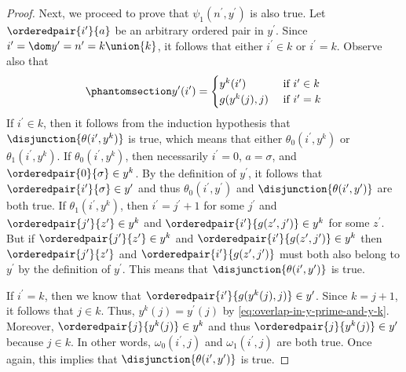 \begin{proof}
    \vspace{0.3cm}
    \noindent
    Next, we proceed to prove that \( \psi_{1}(n^{\prime}, y^{\prime}) \) is also true.
    Let \( \orderedpair{i^{\prime}}{a} \) be an arbitrary ordered pair in \( y^{\prime} \).
    Since \( i^{\prime} = \dom y^{\prime} = n^{\prime} = k \union \mleft\{ k \mright\} \), it follows that either \( i^{\prime} \in k \) or \( i^{\prime} = k \).
    Observe also that
    \begin{equation}
        \phantomsection \label{eq:overlap-in-y-prime-and-y-k}
        y^{\prime}(i^{\prime}) =
        \begin{cases}
            y^{k}(i^{\prime}) \ &\text{if} \ i^{\prime} \in k\\
            g(y^{k}(j), j)  \ &\text{if} \ i^{\prime} = k
        \end{cases}
    \end{equation}
    If \( i^{\prime} \in k \), then it follows from the induction hypothesis that \( \disjunction{\theta(i^{\prime}, y^{k})} \) is true, which means that
    either \( \theta_{0}(i^{\prime}, y^{k}) \) or \( \theta_{1}(i^{\prime}, y^{k}) \).
    If \( \theta_{0}(i^{\prime}, y^{k}) \), then necessarily \( i^{\prime} = 0 \), \( a = \sigma \), and \( \orderedpair{0}{\sigma} \in y^{k} \).
    By the definition of \( y^{\prime} \), it follows that \( \orderedpair{i^{\prime}}{\sigma} \in y^{\prime} \) and thus \( \theta_{0}(i^{\prime}, y^{\prime}) \)
    and \( \disjunction{\theta(i^{\prime}, y^{\prime})} \) are both true.
    If \( \theta_{1}(i^{\prime}, y^{k}) \), then \( i^{\prime} = j^{\prime} + 1 \) for some \( j^{\prime} \) and \( \orderedpair{j^{\prime}}{z^{\prime}} \in y^{k} \)
    and \( \orderedpair{i^{\prime}}{g(z^{\prime}, j^{\prime})} \in y^{k} \) for some \( z^{\prime} \).
    But if \( \orderedpair{j^{\prime}}{z^{\prime}} \in y^{k} \) and \( \orderedpair{i^{\prime}}{g(z^{\prime}, j^{\prime})} \in y^{k} \)
    then \( \orderedpair{j^{\prime}}{z^{\prime}} \) and \( \orderedpair{i^{\prime}}{g(z^{\prime}, j^{\prime})} \) must both also belong to \( y^{\prime} \) by the definition
    of \( y^{\prime} \).
    This means that \( \disjunction{\theta(i^{\prime}, y^{\prime})} \) is true.

    \vspace{0.3cm}
    \noindent
    If \( i^{\prime} = k \), then we know that \( \orderedpair{i^{\prime}}{g(y^{k}(j), j)} \in y^{\prime} \).
    Since \( k = j + 1 \), it follows that \( j \in k \). Thus, \( y^{k}(j) = y^{\prime}(j) \) by \eqref{eq:overlap-in-y-prime-and-y-k}.
    Moreover, \( \orderedpair{j}{y^{k}(j)} \in y^{k} \) and thus \( \orderedpair{j}{y^{k}(j)} \in y^{\prime} \) because \( j \in k \).
    In other words, \( \omega_{0}(i^{\prime}, j) \) and \( \omega_{1}(i^{\prime}, j) \) are both true.
    Once again, this implies that \( \disjunction{\theta(i^{\prime}, y^{\prime})} \) is true.


\end{proof}
